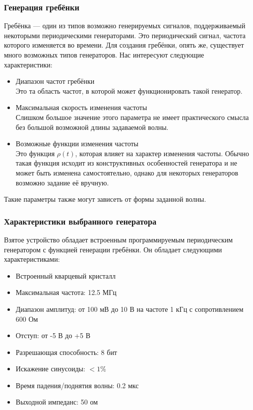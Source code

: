 \documentclass[a4paper,12pt]{report}
\numberwithin{equation}{section}
\begin{document}
\subsubsection{Генерация гребёнки}
Гребёнка --- один из типов возможно генерируемых сигналов, поддерживаемый
некоторыми периодическими генераторами. Это периодический сигнал, частота
которого изменяется во времени. Для создания гребёнки, опять же, существует
много возможных типов генераторов. Нас интересуют следующие характеристики:
\begin{itemize}
\item Диапазон частот гребёнки \\
Это та область частот, в которой может функционировать такой генератор.
\item Максимальная скорость изменения частоты \\
Слишком большое значение этого параметра не имеет практического смысла без
большой возможной длины задаваемой волны.
\item Возможные функции изменения частоты \\
Это функция $\rho(t)$, которая влияет на характер изменения частоты. Обычно
такая функция исходит из конструктивных особенностей генератора и не может быть
изменена самостоятельно, однако для некоторых генераторов возможно задание её
вручную.
\end{itemize}
Такие параметры также могут зависеть от формы заданной волны.

\subsubsection{Характеристики выбранного генератора}
Взятое устройство обладает встроенным программируемым периодическим генератором
с функцией генерации гребёнки. Он обладает следующими характеристиками:
\begin{itemize}
\item Встроенный кварцевый кристалл
\item Максимальная частота: 12.5 МГц
\item Диапазон амплитуд: от 100 мВ до 10 В на частоте 1 кГц с сопротивлением 600 Ом
\item Отступ: от -5 В до +5 В
\item Разрешающая способность: 8 бит
\item Искажение синусоиды: $< 1\%$
\item Время падения/поднятия волны: 0.2 мкс
\item Выходной импеданс: 50 ом
\end{itemize}
\end{document}
